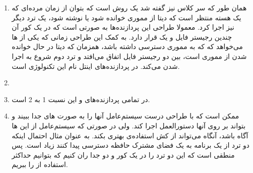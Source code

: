 \begin{enumerate}
    \item همان طور که سر کلاس نیز گفته شد
    یک روش است که بتوان از زمان مرده‌ای که یک هسته منتظر است که دیتا از مموری خوانده شود یا نوشته شود،
    یک ترد دیگر نیز اجرا کرد.
    معمولا طراحی این پردازنده‌ها به صورتی است که در یک کور آن چندین رجیستر فایل و یک
    قرار دارد.
    به کمک این طراحی زمانی که یکی از
    ها
    می‌خواهد که که به مموری دسترسی داشته باشد، همزمان که دیتا در حال خوانده شدن از مموری است،
    بین دو رجیستر فایل اتفاق می‌افتد و ترد دوم شروع به اجرا شدن می‌کند.
    در پردازنده‌های اینتل نام این تکنولوژی
    است.
    \item {}
    \item در تمامی پردازنده‌های
     و 
    این نسبت 1 به 2 است.
    \item ممکن است که با طراحی درست  سیستم‌عامل آنها را به صورت های
    جدا ببیند و بتواند بر روی آنها دستورالعمل اجرا کند. ولی در صورتی که سیستم‌عامل از این
    ها
    آگاه باشد، آنگاه می‌تواند از کش استفاده‌ی بهتری بکند. به عنوان مثال احتمال اینکه دو ترد از یک برنامه
    به یک فضای مشترک حافظه دسترسی پیدا کنند زیاد است. پس منطقی است که این دو ترد را در یک کور و دو
    جدا ران کنیم که بتوانیم حداکثر استفاده از
    را ببریم.
    \\
\end{enumerate}



